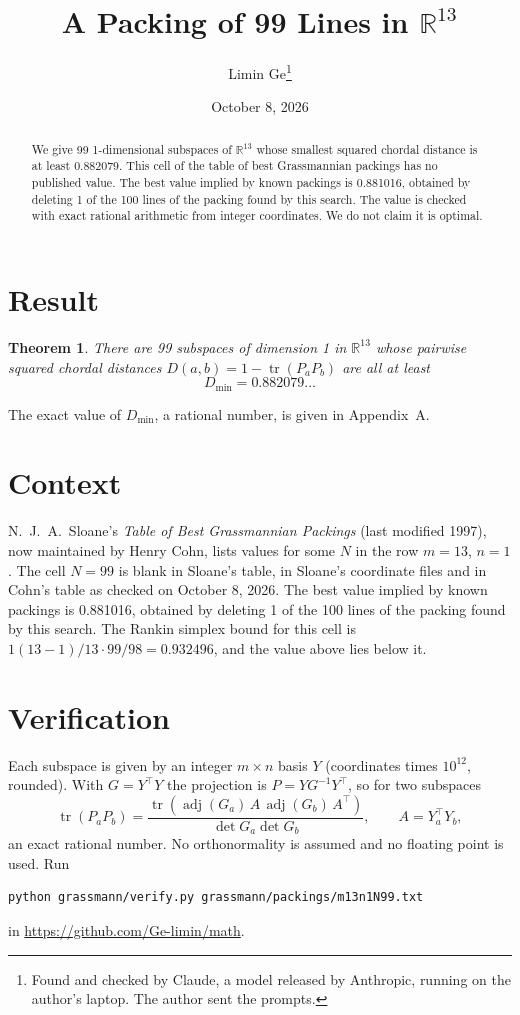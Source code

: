 \documentclass[11pt,a4paper]{article}
\title{A Packing of 99 Lines in $\mathbb{R}^{13}$}
\author{Limin Ge\thanks{Found and checked by Claude, a model released by Anthropic, running on the author's laptop. The author sent the prompts.}}
\date{October 8, 2026}
\newtheorem*{theorem}{Theorem}
\begin{document}
\maketitle
\begin{abstract}
We give 99 1-dimensional subspaces of $\mathbb{R}^{13}$ whose smallest squared chordal distance is at least 0.882079. This cell of the table of best Grassmannian packings has no published value. The best value implied by known packings is 0.881016, obtained by deleting 1 of the 100 lines of the packing found by this search. The value is checked with exact rational arithmetic from integer coordinates. We do not claim it is optimal.
\end{abstract}

\section{Result}
\begin{theorem}
There are 99 subspaces of dimension 1 in $\mathbb{R}^{13}$ whose pairwise squared chordal distances $D(a,b) = 1 - \operatorname{tr}(P_aP_b)$ are all at least
\[ D_{\min} = 0.882079\ldots \]
\end{theorem}
The exact value of $D_{\min}$, a rational number, is given in Appendix~A.


\section{Context}
N.~J.~A.~Sloane's \emph{Table of Best Grassmannian Packings} (last modified 1997), now maintained by Henry Cohn, lists values for some $N$ in the row $m=13$, $n=1$. The cell $N=99$ is blank in Sloane's table, in Sloane's coordinate files and in Cohn's table as checked on October 8, 2026. The best value implied by known packings is 0.881016, obtained by deleting 1 of the 100 lines of the packing found by this search. The Rankin simplex bound for this cell is $1(13-1)/13\cdot 99/98 = 0.932496$, and the value above lies below it.


\section{Verification}
Each subspace is given by an integer $m\times n$ basis $Y$ (coordinates times $10^{12}$, rounded). With $G=Y^\top Y$ the projection is $P=YG^{-1}Y^\top$, so for two subspaces
\[ \operatorname{tr}(P_aP_b)=\frac{\operatorname{tr}(\operatorname{adj}(G_a)\,A\,\operatorname{adj}(G_b)\,A^\top)}{\det G_a\det G_b},\qquad A=Y_a^\top Y_b, \]
an exact rational number. No orthonormality is assumed and no floating point is used. Run
\begin{verbatim}
python grassmann/verify.py grassmann/packings/m13n1N99.txt
\end{verbatim}
in \url{https://github.com/Ge-limin/math}.
\end{document}
